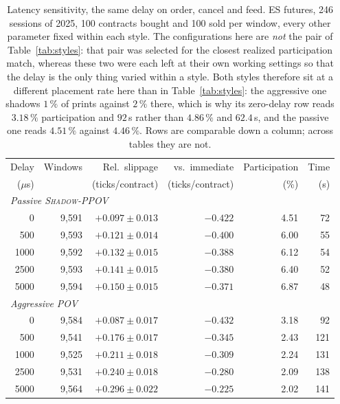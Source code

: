 \documentclass[11pt]{article}
\newcommand{\pov}{\textsc{Shadow-PPOV}}
\begin{document}
\begin{table}[t]
\centering
\caption{Latency sensitivity, the same delay on order, cancel and feed. ES
futures, 246 sessions of 2025, 100 contracts bought and 100 sold per window,
every other parameter fixed within each style. The configurations here are
\emph{not} the pair of Table~\ref{tab:styles}: that pair was selected for the
closest realized participation match, whereas these two were each left at their
own working settings so that the delay is the only thing varied within a style.
Both styles therefore sit at a different placement rate here than in
Table~\ref{tab:styles}: the aggressive one shadows $1\,\%$ of prints against
$2\,\%$ there, which is why its zero-delay row reads $3.18\,\%$ participation
and $92$\,s rather than $4.86\,\%$ and $62.4$\,s, and the passive one reads
$4.51\,\%$ against $4.46\,\%$. Rows are comparable down a column; across
tables they are not.}
\label{tab:latency}
\small
\begin{tabular}{rrrrrr}
\toprule
Delay & Windows & Rel.\ slippage & vs.\ immediate & Participation & Time \\
($\mu$s) & & (ticks/contract) & (ticks/contract) & (\%) & (s) \\
\midrule
\multicolumn{6}{l}{\emph{Passive \pov{}}}\\
0 & 9{,}591 & $+0.097 \pm 0.013$ & $-0.422$ & 4.51 & 72 \\
500 & 9{,}593 & $+0.121 \pm 0.014$ & $-0.400$ & 6.00 & 55 \\
1000 & 9{,}592 & $+0.132 \pm 0.015$ & $-0.388$ & 6.12 & 54 \\
2500 & 9{,}593 & $+0.141 \pm 0.015$ & $-0.380$ & 6.40 & 52 \\
5000 & 9{,}594 & $+0.150 \pm 0.015$ & $-0.371$ & 6.87 & 48 \\
\midrule
\multicolumn{6}{l}{\emph{Aggressive POV}}\\
0 & 9{,}584 & $+0.087 \pm 0.017$ & $-0.432$ & 3.18 & 92 \\
500 & 9{,}541 & $+0.176 \pm 0.017$ & $-0.345$ & 2.43 & 121 \\
1000 & 9{,}525 & $+0.211 \pm 0.018$ & $-0.309$ & 2.24 & 131 \\
2500 & 9{,}531 & $+0.240 \pm 0.018$ & $-0.280$ & 2.09 & 138 \\
5000 & 9{,}564 & $+0.296 \pm 0.022$ & $-0.225$ & 2.02 & 141 \\
\bottomrule
\end{tabular}
\end{table}
\end{document}
